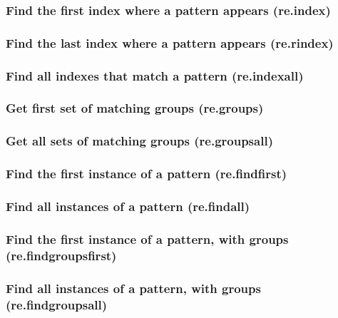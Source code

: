 \documentclass{article}
\theoremstyle{definition}
\begin{document}
\subsubsection{Find the first index where a pattern appears (re.index)}

\subsubsection{Find the last index where a pattern appears (re.rindex)}

\subsubsection{Find all indexes that match a pattern (re.indexall)}

\subsubsection{Get first set of matching groups (re.groups)}

\subsubsection{Get all sets of matching groups (re.groupsall)}

\subsubsection{Find the first instance of a pattern (re.findfirst)}

\subsubsection{Find all instances of a pattern (re.findall)}

\subsubsection{Find the first instance of a pattern, with groups (re.findgroupsfirst)}

\subsubsection{Find all instances of a pattern, with groups (re.findgroupsall)}
\end{document}
